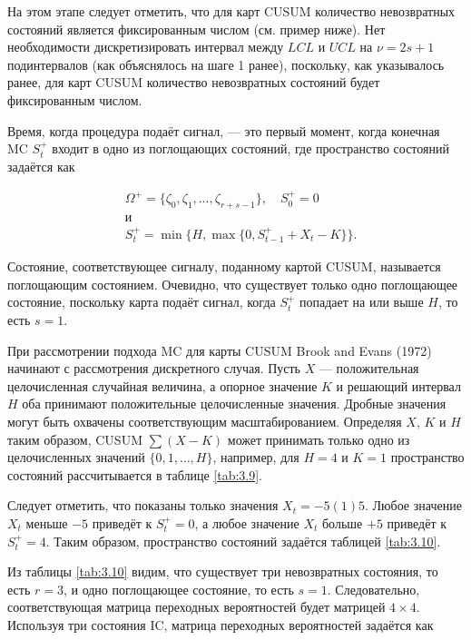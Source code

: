 На этом этапе следует отметить, что для карт CUSUM количество невозвратных состояний является фиксированным числом (см. пример ниже). Нет необходимости дискретизировать интервал между \(LCL\) и \(UCL\) на \(\nu = 2s + 1\) подинтервалов (как объяснялось на шаге 1 ранее), поскольку, как указывалось ранее, для карт CUSUM количество невозвратных состояний будет фиксированным числом.

Время, когда процедура подаёт сигнал, — это первый момент, когда конечная MC \(S_t^+\) входит в одно из поглощающих состояний, где пространство состояний задаётся как

\begin{equation}
	\begin{aligned}
		&\Omega^{+} = \{\zeta_{0}, \zeta_{1}, \ldots, \zeta_{r+s-1}\}, \quad S_{0}^{+} = 0 \\
		&\text{и} \\
		&S_{t}^{+} = \min\{H, \max\{0, S_{t-1}^{+} + X_{t} - K\}\}.
	\end{aligned}
	\label{eq:3.27}
\end{equation}

Состояние, соответствующее сигналу, поданному картой CUSUM, называется поглощающим состоянием. Очевидно, что существует только одно поглощающее состояние, поскольку карта подаёт сигнал, когда \(S_t^+\) попадает на или выше \(H\), то есть \(s = 1\).

При рассмотрении подхода MC для карты CUSUM Brook and Evans (1972) начинают с рассмотрения дискретного случая. Пусть \(X\) — положительная целочисленная случайная величина, а опорное значение \(K\) и решающий интервал \(H\) оба принимают положительные целочисленные значения. Дробные значения могут быть охвачены соответствующим масштабированием. Определяя \(X\), \(K\) и \(H\) таким образом, CUSUM \(\sum(X - K)\) может принимать только одно из целочисленных значений \(\{0, 1, \ldots, H\}\), например, для \(H = 4\) и \(K = 1\) пространство состояний рассчитывается в таблице \ref{tab:3.9}.

Следует отметить, что показаны только значения \(X_t = -5(1)5\). Любое значение \(X_t\) меньше \(-5\) приведёт к \(S_t^+ = 0\), а любое значение \(X_t\) больше \(+5\) приведёт к \(S_t^+ = 4\). Таким образом, пространство состояний задаётся таблицей \ref{tab:3.10}.

Из таблицы \ref{tab:3.10} видим, что существует три невозвратных состояния, то есть \(r = 3\), и одно поглощающее состояние, то есть \(s = 1\). Следовательно, соответствующая матрица переходных вероятностей будет матрицей \(4 \times 4\). Используя три состояния IC, матрица переходных вероятностей задаётся как

